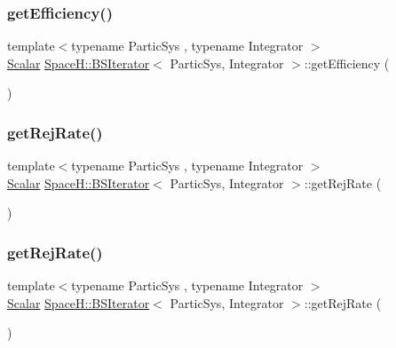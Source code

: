 \subsubsection{\texorpdfstring{get\+Efficiency()}{getEfficiency()}}
{\footnotesize\ttfamily template$<$typename Partic\+Sys , typename Integrator $>$ \\
\mbox{\hyperlink{class_space_h_1_1_b_s_iterator_a89993409583b3022709bdfd84ea8149d}{Scalar}} \mbox{\hyperlink{class_space_h_1_1_b_s_iterator}{Space\+H\+::\+B\+S\+Iterator}}$<$ Partic\+Sys, Integrator $>$\+::get\+Efficiency (\begin{DoxyParamCaption}{ }\end{DoxyParamCaption})\hspace{0.3cm}{\ttfamily [inline]}}

\mbox{\label{class_space_h_1_1_b_s_iterator_a86345cb32e6cb2da0437a3697866501f}} 
\subsubsection{\texorpdfstring{get\+Rej\+Rate()}{getRejRate()}\hspace{0.1cm}{\footnotesize\ttfamily [1/2]}}
{\footnotesize\ttfamily template$<$typename Partic\+Sys , typename Integrator $>$ \\
\mbox{\hyperlink{class_space_h_1_1_b_s_iterator_a89993409583b3022709bdfd84ea8149d}{Scalar}} \mbox{\hyperlink{class_space_h_1_1_b_s_iterator}{Space\+H\+::\+B\+S\+Iterator}}$<$ Partic\+Sys, Integrator $>$\+::get\+Rej\+Rate (\begin{DoxyParamCaption}{ }\end{DoxyParamCaption})\hspace{0.3cm}{\ttfamily [inline]}}

\mbox{\label{class_space_h_1_1_b_s_iterator_a86345cb32e6cb2da0437a3697866501f}} 
\subsubsection{\texorpdfstring{get\+Rej\+Rate()}{getRejRate()}\hspace{0.1cm}{\footnotesize\ttfamily [2/2]}}
{\footnotesize\ttfamily template$<$typename Partic\+Sys , typename Integrator $>$ \\
\mbox{\hyperlink{class_space_h_1_1_b_s_iterator_a89993409583b3022709bdfd84ea8149d}{Scalar}} \mbox{\hyperlink{class_space_h_1_1_b_s_iterator}{Space\+H\+::\+B\+S\+Iterator}}$<$ Partic\+Sys, Integrator $>$\+::get\+Rej\+Rate (\begin{DoxyParamCaption}{ }\end{DoxyParamCaption})\hspace{0.3cm}{\ttfamily [inline]}}

